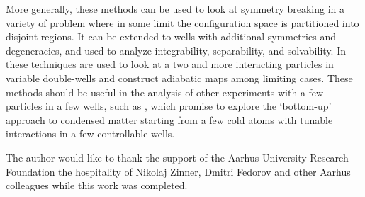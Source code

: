 More generally, these methods can be used to look at symmetry breaking in a variety of problem where in some limit the configuration space is partitioned into disjoint regions. It can be extended to wells with additional symmetries and degeneracies, and used to analyze integrability, separability, and solvability. In \cite{harshman2016c} these techniques are used to look at a two and more interacting particles in variable double-wells and construct adiabatic maps among limiting cases. These methods should be useful in the analysis of other experiments with a few particles in a few wells, such as \cite{kaufman2014, kaufman2015}, which promise to explore the `bottom-up' approach to condensed matter starting from a few cold atoms with tunable interactions in a few controllable wells.

\begin{acknowledgements}
The author would like to thank the support of the Aarhus University Research Foundation the hospitality of Nikolaj Zinner, Dmitri Fedorov and other Aarhus colleagues while this work was completed.
\end{acknowledgements}


